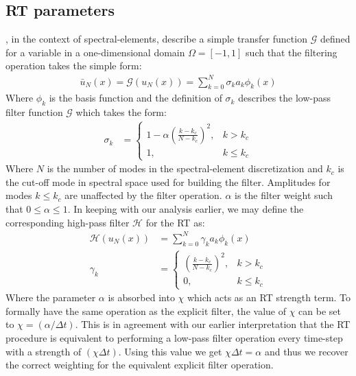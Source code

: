 \subsection{RT parameters}
\cite{malm13}, in the context of spectral-elements, describe a simple transfer function $\mathcal{G}$ defined for a variable in a one-dimensional domain $\Omega=[-1, 1]$ such that the filtering operation takes the simple form: 
\begin{align}
\bar{u}_{N}(x) = \mathcal{G}(u_{N}(x)) = \sum_{k=0}^{N}\sigma_{k}a_{k}\phi_{k}(x)
\end{align}
Where $\phi_{k}$ is the basis function and the definition of $\sigma_{k}$ describes the low-pass filter function $\mathcal{G}$ which takes the form:
\begin{align}
\sigma_{k} &=
	\begin{cases}
	1 - \alpha\left(\frac{k-k_{c}}{N-k_{c}}  \right)^{2}, & k>k_{c} \\
	1, & k\le k_{c}
	\end{cases}
\end{align}
Where $N$ is the number of modes in the spectral-element discretization and $k_{c}$ is the cut-off mode in spectral space used for building the filter. Amplitudes for modes $k\le k_{c}$ are unaffected by the filter operation. $\alpha$ is the filter weight such that $0\le\alpha\le1$. In keeping with our analysis earlier, we may define the corresponding high-pass filter $\mathcal{H}$ for the RT as:
\begin{align}
\mathcal{H}(u_{N}(x)) &= \sum_{k=0}^{N}\gamma_{k}a_{k}\phi_{k}(x) \\
\gamma_{k} &=
\begin{cases}
	\left(\frac{k-k_{c}}{N-k_{c}}  \right)^{2}, & k>k_{c} \\
	0, & k\le k_{c}
\end{cases}
\end{align}
Where the parameter $\alpha$ is absorbed into $\chi$ which acts as an RT strength term. To formally have the same operation as the explicit filter, the value of $\chi$ can be set to $\chi=(\alpha/\Delta t)$. This is in agreement with our earlier interpretation that the RT procedure is equivalent to performing a low-pass filter operation every time-step with a strength of $(\chi\Delta t)$. Using this value we get $\chi\Delta t = \alpha$ and thus we recover the correct weighting for the equivalent explicit filter operation. 

